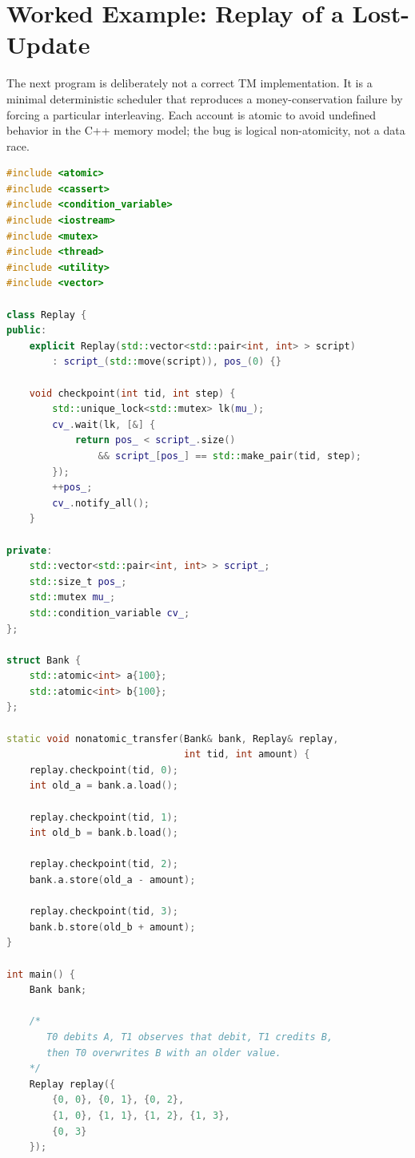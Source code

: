 \section{Worked Example: Replay of a Lost-Update}
\label{sec:replay-lost-update}

The next program is deliberately not a correct TM implementation. It is a minimal deterministic scheduler that reproduces a money-conservation failure by forcing a particular interleaving. Each account is atomic to avoid undefined behavior in the C++ memory model; the bug is logical non-atomicity, not a data race.

\begin{lstlisting}[language=C++, caption={A deterministic replay schedule that exposes a non-atomic transfer.}]
#include <atomic>
#include <cassert>
#include <condition_variable>
#include <iostream>
#include <mutex>
#include <thread>
#include <utility>
#include <vector>

class Replay {
public:
    explicit Replay(std::vector<std::pair<int, int> > script)
        : script_(std::move(script)), pos_(0) {}

    void checkpoint(int tid, int step) {
        std::unique_lock<std::mutex> lk(mu_);
        cv_.wait(lk, [&] {
            return pos_ < script_.size()
                && script_[pos_] == std::make_pair(tid, step);
        });
        ++pos_;
        cv_.notify_all();
    }

private:
    std::vector<std::pair<int, int> > script_;
    std::size_t pos_;
    std::mutex mu_;
    std::condition_variable cv_;
};

struct Bank {
    std::atomic<int> a{100};
    std::atomic<int> b{100};
};

static void nonatomic_transfer(Bank& bank, Replay& replay,
                               int tid, int amount) {
    replay.checkpoint(tid, 0);
    int old_a = bank.a.load();

    replay.checkpoint(tid, 1);
    int old_b = bank.b.load();

    replay.checkpoint(tid, 2);
    bank.a.store(old_a - amount);

    replay.checkpoint(tid, 3);
    bank.b.store(old_b + amount);
}

int main() {
    Bank bank;

    /*
       T0 debits A, T1 observes that debit, T1 credits B,
       then T0 overwrites B with an older value.
    */
    Replay replay({
        {0, 0}, {0, 1}, {0, 2},
        {1, 0}, {1, 1}, {1, 2}, {1, 3},
        {0, 3}
    });


\end{lstlisting}
